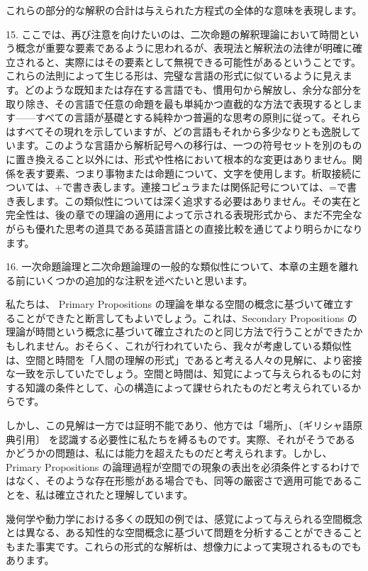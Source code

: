 \documentclass[a4paper,11pt,openany]{ltjsbook}
\begin{document}
これらの部分的な解釈の合計は与えられた方程式の全体的な意味を表現します。

15. ここでは、再び注意を向けたいのは、二次命題の解釈理論において時間という概念が重要な要素であるように思われるが、表現法と解釈法の法律が明確に確立されると、実際にはその要素として無視できる可能性があるということです。これらの法則によって生じる形は、完璧な言語の形式に似ているように見えます。どのような既知または存在する言語でも、慣用句から解放し、余分な部分を取り除き、その言語で任意の命題を最も単純かつ直截的な方法で表現するとします——すべての言語が基礎とする純粋かつ普遍的な思考の原則に従って。それらはすべてその現れを示していますが、どの言語もそれから多少なりとも逸脱しています。このような言語から解析記号への移行は、一つの符号セットを別のものに置き換えること以外には、形式や性格において根本的な変更はありません。関係を表す要素、つまり事物または命題について、文字を使用します。析取接続については、+で書き表します。連接コピュラまたは関係記号については、=で書き表します。この類似性については深く追求する必要はありません。その実在と完全性は、後の章での理論の適用によって示される表現形式から、まだ不完全ながらも優れた思考の道具である英語言語との直接比較を通じてより明らかになります。

16. 一次命題論理と二次命題論理の一般的な類似性について、本章の主題を離れる前にいくつかの追加的な注釈を述べたいと思います。

私たちは、 Primary Propositions の理論を単なる空間の概念に基づいて確立することができたと断言してもよいでしょう。これは、Secondary Propositions の理論が時間という概念に基づいて確立されたのと同じ方法で行うことができたかもしれません。おそらく、これが行われていたら、我々が考慮している類似性は、空間と時間を「人間の理解の形式」であると考える人々の見解に、より密接な一致を示していたでしょう。空間と時間は、知覚によって与えられるものに対する知識の条件として、心の構造によって課せられたものだと考えられているからです。

しかし、この見解は一方では証明不能であり、他方では「場所」、〔ギリシャ語原典引用〕 を認識する必要性に私たちを縛るものです。実際、それがそうであるかどうかの問題は、私には能力を超えたものだと考えられます。しかし、Primary Propositions の論理過程が空間での現象の表出を必須条件とするわけではなく、そのような存在形態がある場合でも、同等の厳密さで適用可能であることを、私は確立されたと理解しています。

幾何学や動力学における多くの既知の例では、感覚によって与えられる空間概念とは異なる、ある知性的な空間概念に基づいて問題を分析することができることもまた事実です。これらの形式的な解析は、想像力によって実現されるものでもあります。
\end{document}
